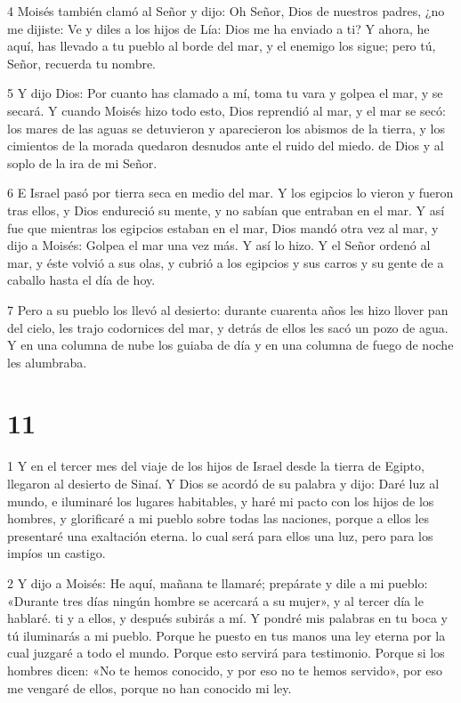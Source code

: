 \par 4 Moisés también clamó al Señor y dijo: Oh Señor, Dios de nuestros padres, ¿no me dijiste: Ve y diles a los hijos de Lía: Dios me ha enviado a ti? Y ahora, he aquí, has llevado a tu pueblo al borde del mar, y el enemigo los sigue; pero tú, Señor, recuerda tu nombre.

\par 5 Y dijo Dios: Por cuanto has clamado a mí, toma tu vara y golpea el mar, y se secará. Y cuando Moisés hizo todo esto, Dios reprendió al mar, y el mar se secó: los mares de las aguas se detuvieron y aparecieron los abismos de la tierra, y los cimientos de la morada quedaron desnudos ante el ruido del miedo. de Dios y al soplo de la ira de mi Señor.

\par 6 E Israel pasó por tierra seca en medio del mar. Y los egipcios lo vieron y fueron tras ellos, y Dios endureció su mente, y no sabían que entraban en el mar. Y así fue que mientras los egipcios estaban en el mar, Dios mandó otra vez al mar, y dijo a Moisés: Golpea el mar una vez más. Y así lo hizo. Y el Señor ordenó al mar, y éste volvió a sus olas, y cubrió a los egipcios y sus carros y su gente de a caballo hasta el día de hoy.

\par 7 Pero a su pueblo los llevó al desierto: durante cuarenta años les hizo llover pan del cielo, les trajo codornices del mar, y detrás de ellos les sacó un pozo de agua. Y en una columna de nube los guiaba de día y en una columna de fuego de noche les alumbraba.

\chapter{11}

\par 1 Y en el tercer mes del viaje de los hijos de Israel desde la tierra de Egipto, llegaron al desierto de Sinaí. Y Dios se acordó de su palabra y dijo: Daré luz al mundo, e iluminaré los lugares habitables, y haré mi pacto con los hijos de los hombres, y glorificaré a mi pueblo sobre todas las naciones, porque a ellos les presentaré una exaltación eterna. lo cual será para ellos una luz, pero para los impíos un castigo.

\par 2 Y dijo a Moisés: He aquí, mañana te llamaré; prepárate y dile a mi pueblo: «Durante tres días ningún hombre se acercará a su mujer», y al tercer día le hablaré. ti y a ellos, y después subirás a mí. Y pondré mis palabras en tu boca y tú iluminarás a mi pueblo. Porque he puesto en tus manos una ley eterna por la cual juzgaré a todo el mundo. Porque esto servirá para testimonio. Porque si los hombres dicen: «No te hemos conocido, y por eso no te hemos servido», por eso me vengaré de ellos, porque no han conocido mi ley.

